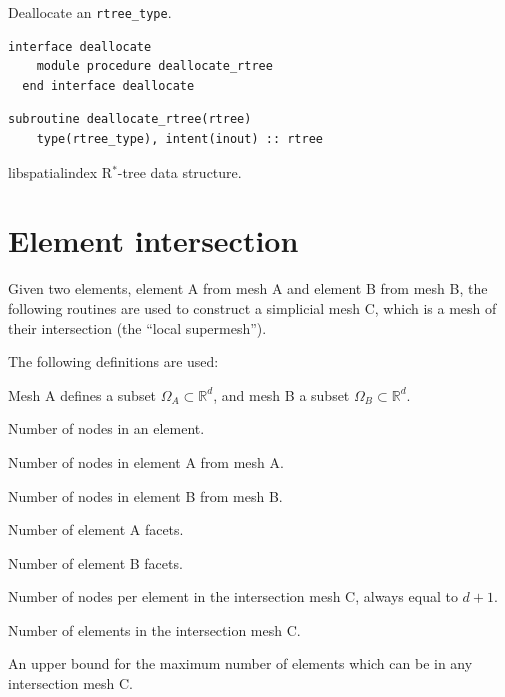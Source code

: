 \documentclass{article}
\begin{document}
\noindent Deallocate an \verb+rtree_type+.
  
\begin{lstlisting}[language=FORTRAN]
  interface deallocate
    module procedure deallocate_rtree
  end interface deallocate
\end{lstlisting}
  
\begin{lstlisting}[language=FORTRAN]  
  subroutine deallocate_rtree(rtree)
    type(rtree_type), intent(inout) :: rtree
\end{lstlisting}

\begin{description}[font=\ttfamily\bfseries,leftmargin=2.2\parindent,labelindent=1.7\parindent,noitemsep]
  \item[rtree] libspatialindex R${}^*$-tree data structure.
\end{description}

\section{Element intersection}

Given two elements, element A from mesh A and element B from mesh B, the
following routines are used to construct a simplicial mesh C, which is a mesh of
their intersection (the ``local supermesh'').

The following definitions are used:
\begin{description}[leftmargin=\parindent,labelindent=\parindent]
  \item[$d$] Mesh A defines a subset $\Omega_A \subset \mathbb{R}^d$, and mesh B
    a subset $\Omega_B \subset \mathbb{R}^d$.
  \item[$l$] Number of nodes in an element.
  \item[$l_A$] Number of nodes in element A from mesh A.
  \item[$l_B$] Number of nodes in element B from mesh B.
  \item[$F_A$] Number of element A facets.
  \item[$F_B$] Number of element B facets.
  \item[$l_C$] Number of nodes per element in the intersection mesh C, always
               equal to $d + 1$.
  \item[$E_C$] Number of elements in the intersection mesh C.
  \item[$M_C$] An upper bound for the maximum number of elements which can be
               in any intersection mesh C.
\end{description}
\end{document}
